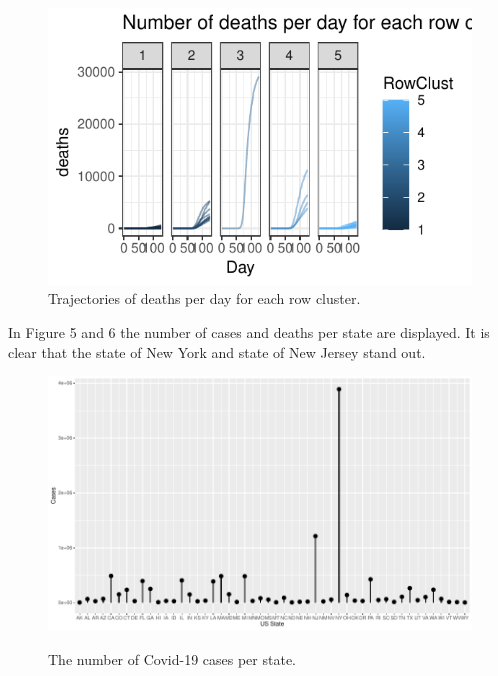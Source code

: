 \documentclass[12pt,a4paper]{article}
\begin{document}
\begin{figure}[H]
	\begin{center}
		\includegraphics{TrajectoriesPerCluster_deaths.pdf}
		\caption{Trajectories of deaths per day for each row cluster.}
		\label{fig16}
	\end{center}
\end{figure}

 In Figure 5 and 6 the number of cases and deaths per state are displayed. It is clear that the state of New York and state of New Jersey stand out. 

\begin{figure}
	\includegraphics[width=\columnwidth]{NumberOfCases.pdf}
	\label{fig4}
	\caption{The number of Covid-19 cases per state.}
\end{figure}
\end{document}
